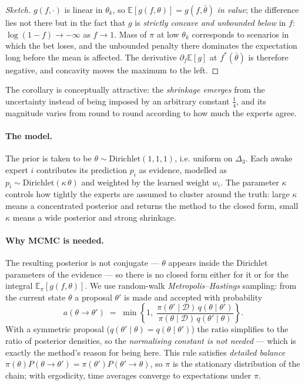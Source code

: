 \documentclass[12pt,a4paper,oneside]{report}
\renewcommand{\_}{\oldunderscore\allowbreak}
\theoremstyle{definition}
\theoremstyle{plain}
\theoremstyle{remark}
\begin{document}
\begin{proof}[Sketch]
$g(f,\cdot)$ is linear in $\theta_k$, so $\mathbb{E}[g(f,\theta)] = g(f,\bar{\theta})$ \emph{in
value}; the difference lies not there but in the fact that $g$ is \emph{strictly concave and
unbounded below} in $f$: $\log(1-f)\to-\infty$ as $f\to1$. Mass of $\pi$ at low $\theta_k$
corresponds to scenarios in which the bet loses, and the unbounded penalty there dominates the
expectation long before the mean is affected. The derivative $\partial_f \mathbb{E}[g]$ at
$f^{*}(\bar\theta)$ is therefore negative, and concavity moves the maximum to the left.
\end{proof}

The corollary is conceptually attractive: the \emph{shrinkage emerges} from the uncertainty
instead of being imposed by an arbitrary constant $\tfrac14$, and its magnitude varies from round
to round according to how much the experts agree.

\paragraph{The model.} The prior is taken to be $\theta \sim \mathrm{Dirichlet}(1,1,1)$, i.e.
uniform on $\Delta_3$. Each awake expert $i$ contributes its prediction $p_i$ as evidence,
modelled as $p_i \sim \mathrm{Dirichlet}(\kappa\,\theta)$ and weighted by the learned weight
$w_i$. The parameter $\kappa$ controls how tightly the experts are assumed to cluster around the
truth: large $\kappa$ means a concentrated posterior and returns the method to the closed form,
small $\kappa$ means a wide posterior and strong shrinkage.

\paragraph{Why MCMC is needed.} The resulting posterior is not conjugate --- $\theta$ appears
inside the Dirichlet parameters of the evidence --- so there is no closed form either for it or
for the integral $\mathbb{E}_{\pi}[g(f,\theta)]$. We use random-walk
\emph{Metropolis--Hastings} sampling: from the current state $\theta$ a proposal $\theta'$ is
made and accepted with probability
\[
a(\theta\to\theta') \;=\; \min\!\left\{1,\;
\frac{\pi(\theta'\mid\mathcal{D})\,q(\theta\mid\theta')}{\pi(\theta\mid\mathcal{D})\,q(\theta'\mid\theta)}\right\}.
\]
With a symmetric proposal ($q(\theta'\mid\theta)=q(\theta\mid\theta')$) the ratio simplifies to
the ratio of posterior densities, so the \emph{normalising constant is not needed} --- which is
exactly the method's reason for being here. This rule satisfies \emph{detailed balance}
$\pi(\theta)P(\theta\to\theta') = \pi(\theta')P(\theta'\to\theta)$, so $\pi$ is the stationary
distribution of the chain; with ergodicity, time averages converge to expectations under $\pi$.
\end{document}
